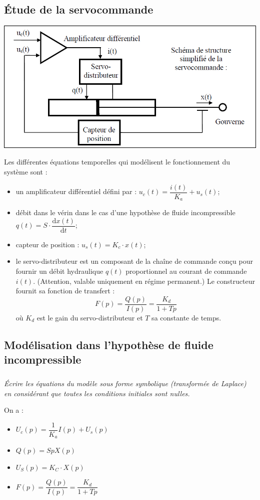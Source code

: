 \documentclass[10pt,fleqn]{article} %
\begin{document}
\begin{multicols}{2}
\begin{obj}
\end{obj}

\subsection*{Étude de la servocommande}
\ifprof \else

\begin{center}
\includegraphics[width=.7\linewidth]{images/img5}
\end{center}

Les différentes équations temporelles qui modélisent le fonctionnement du système sont :
\begin{itemize}
\item un amplificateur différentiel défini par : $u_c(t)=\dfrac{i(t)}{K_a}+u_s(t)$;
\item débit dans le vérin dans le cas d'une hypothèse de fluide incompressible $q(t)=S\cdot\dfrac{\text{d}x(t)}{\text{d}t}$;
\item capteur de position : $u_s(t)=K_c\cdot x(t)$;
\item le servo-distributeur est un composant de la chaîne de commande conçu pour fournir un débit hydraulique $q(t)$ proportionnel au courant de commande $i(t)$. (Attention, valable uniquement en régime permanent.) Le constructeur fournit sa fonction de transfert :
$$
F(p)=\dfrac{Q(p)}{I(p)}=\dfrac{K_d}{1+Tp}
$$
où $K_d$ est le gain du servo-distributeur et $T$ sa constante de temps.
\end{itemize}


\fi



\subsection*{Modélisation dans l'hypothèse de fluide incompressible}
\subparagraph{}
\textit{Écrire les équations du modèle sous forme symbolique (transformée de Laplace) en considérant que toutes les conditions initiales sont nulles.}

\ifprof
\begin{corrige}
On a :
\begin{itemize}
\item $U_c(p)=\dfrac{1}{K_a}I(p)+U_s(p)$
\item $Q(p)=SpX(p)$
\item $U_S(p)=K_C\cdot X(p)$
\item $F(p)=\dfrac{Q(p)}{I(p)}=\dfrac{K_d}{1+Tp}$
\end{itemize}
\end{corrige}
\else \fi


\end{multicols}
\end{document}
